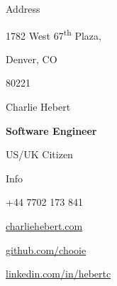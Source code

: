 \noindent
\begin{minipage}[t]{0.333\textwidth}
  {\huge Address}

  \setlength{\parskip}{0.4cm}

  1782 West 67\textsuperscript{th} Plaza,
  
  Denver, CO
  
  80221
\end{minipage}
\noindent
\begin{minipage}[t]{0.333\textwidth}
  \vspace*{\fill}
  \begin{center}
    {\Huge Charlie Hebert}

    \setlength{\parskip}{0.5cm}
    
    \textbf{Software Engineer}
    
    US/UK Citizen
  \end{center}
  \vspace*{\fill}
\end{minipage}
\noindent
\begin{minipage}[t]{0.333\textwidth}
  \begin{flushright}
    {\huge Info}\\
  \end{flushright}

  \begin{description}
    \raggedleft
    \item[Mob] +44 7702 173 841
    \item[Web] \href{http://www.charliehebert.com}{charliehebert.com}
    \item[Github] \href{http://www.github.com/chooie}{github.com/chooie}
    \item[LinkedIn] \href{http://linkedin.com/in/hebertc}{linkedin.com/in/hebertc}
  \end{description}
\end{minipage}

